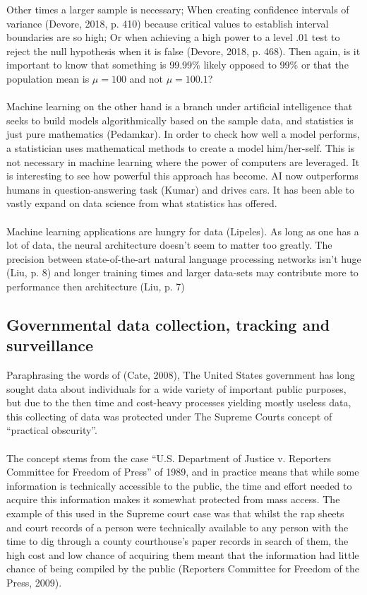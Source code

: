 \documentclass[11pt]{article}
\begin{document}
Other times a larger sample is necessary; When creating confidence intervals of variance (Devore, 2018, p. 410) because critical values to establish interval boundaries are so high; Or when achieving a high power to a level .01 test to reject the null hypothesis when it is false (Devore, 2018, p. 468). Then again, is it important to know that something is 99.99\% likely opposed to 99\% or that the population mean is $\mu = 100$ and not $\mu = 100.1$? \\ \\

Machine learning on the other hand is a branch under artificial intelligence that seeks to build models algorithmically based on the sample data, and statistics is just pure mathematics (Pedamkar). In order to check how well a model performs, a statistician uses mathematical methods to create a model him/her-self. This is not necessary in machine learning where the power of computers are leveraged. It is interesting to see how powerful this approach has become. AI now outperforms humans in question-answering task (Kumar) and drives cars. It has been able to vastly expand on data science from what statistics has offered. \\ \\

Machine learning applications are hungry for data (Lipeles). As long as one has a lot of data, the neural architecture doesn't seem to matter too greatly. The precision between state-of-the-art natural language processing networks isn't huge (Liu, p. 8) and longer training times and larger data-sets may contribute more to performance then architecture (Liu, p. 7)

\subsection{Governmental data collection, tracking and surveillance}
Paraphrasing the words of (Cate, 2008), The United States government has long sought data about individuals for a wide variety of important public purposes, but due to the then time and cost-heavy processes yielding mostly useless data, this collecting of data was protected under The Supreme Courts concept of “practical obscurity”.  \\ \\

The concept stems from the case “U.S. Department of Justice v. Reporters Committee for Freedom of Press” of 1989, and in practice means that while some information is technically accessible to the public, the time and effort needed to acquire this information makes it somewhat protected from mass access. The example of this used in the Supreme court case was that whilst the rap sheets and court records of a person were technically available to any person with the time to dig through a county courthouse’s paper records in search of them, the high cost and low chance of acquiring them meant that the information had little chance of being compiled by the public (Reporters Committee for Freedom of the Press, 2009).  \\ \\
\end{document}
